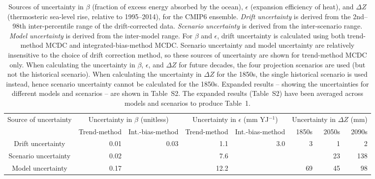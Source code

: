 \begin{table*}[t]
\centering
\caption{Sources of uncertainty in $\beta$ (fraction of excess energy absorbed by the ocean), $\epsilon$ (expansion efficiency of heat), and ${\Delta}Z$ (thermosteric sea-level rise, relative to 1995--2014), for the CMIP6 ensemble. \emph{Drift uncertainty} is derived from the 2nd--98th inter-percentile range of the drift-corrected data. \emph{Scenario uncertainty} is derived from the inter-scenario range. \emph{Model uncertainty} is derived from the inter-model range. For $\beta$ and $\epsilon$, drift uncertainty is calculated using both trend-method MCDC and integrated-bias-method MCDC. Scenario uncertainty and model uncertainty are relatively insensitive to the choice of drift correction method, so these sources of uncertainty are shown for trend-method MCDC only. When calculating the uncertainty in $\beta$, $\epsilon$, and ${\Delta}Z$ for future decades, the four projection scenarios are used (but not the historical scenario). When calculating the uncertainty in ${\Delta}Z$ for the 1850s, the single historical scenario is used instead, hence scenario uncertainty cannot be calculated for the 1850s. Expanded results -- showing the uncertainties for different models and scenarios -- are shown in Table~S2. The expanded results (Table~S2) have been averaged across models and scenarios to produce Table~1.}
\begin{tabular}{c|rr|rr|rrr}
\toprule
Source of uncertainty & \multicolumn{2}{c|}{Uncertainty in $\beta$ (unitless)} & \multicolumn{2}{c|}{Uncertainty in $\epsilon$ (mm YJ$^{-1}$)} & \multicolumn{3}{c}{Uncertainty in ${\Delta}Z$ (mm)} \\
 & Trend-method & Int.-bias-method & Trend-method & Int.-bias-method & 1850s & 2050s & 2090s \\
\midrule
Drift uncertainty & 0.01 & 0.03 & 1.1 & 3.0 & 3 & 1 & 2 \\
Scenario uncertainty & 0.02 &  & 7.6 &  &  & 23 & 138 \\
Model uncertainty & 0.17 &  & 12.2 &  & 69 & 45 & 98 \\
\bottomrule
\end{tabular}
\end{table*}
